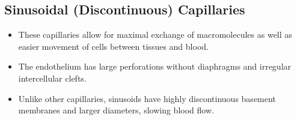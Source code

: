 \begin{itemize}
\begin{itemize}
\begin{center}
      \bigskip

    \end{center}

    \begin{multicols}{2}
      \begin{center}
      \end{center}
    \end{multicols}
  \end{itemize}

  \newpage
  \subsection{Sinusoidal (Discontinuous) Capillaries}
  \begin{itemize}
    \item These capillaries allow for maximal exchange of macromolecules as well as easier movement of cells between tissues and blood. 
    \item The endothelium has large perforations without diaphragms and irregular intercellular clefts.
    \item Unlike other capillaries, sinusoids have highly discontinuous basement membranes and larger diameters, slowing blood flow.
    

    \begin{center}


      \bigskip



    \end{center}

  \end{itemize}

\end{itemize}